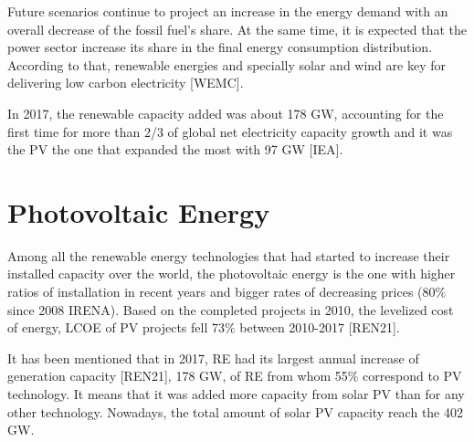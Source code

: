 Future scenarios continue to project an increase in the energy demand with an overall decrease of the fossil fuel's share. At the same time, it is expected that the power sector increase its share in the final energy consumption distribution. According to that, renewable energies and specially solar and wind are key for delivering low carbon electricity [WEMC].

In 2017, the renewable capacity added was about 178 GW, accounting for the first time for more than 2/3 of global net electricity capacity growth and it was the PV the one that expanded the most with 97 GW [IEA].



 
\section{Photovoltaic Energy}

Among all the renewable energy technologies that had started to increase their installed capacity over the world, the photovoltaic energy is the one with higher ratios of installation in recent years and bigger rates of decreasing prices (80$\%$ since 2008 IRENA). Based on the completed projects in 2010, the levelized cost of energy, LCOE of PV projects fell 73$\%$ between 2010-2017 [REN21].

It has been mentioned that in 2017, RE had its largest annual increase of generation capacity [REN21], 178 GW, of RE from whom 55$\%$ correspond to PV technology. It means that it was added more capacity from solar PV than for any other technology. Nowadays, the total amount of solar PV capacity reach the 402 GW.

